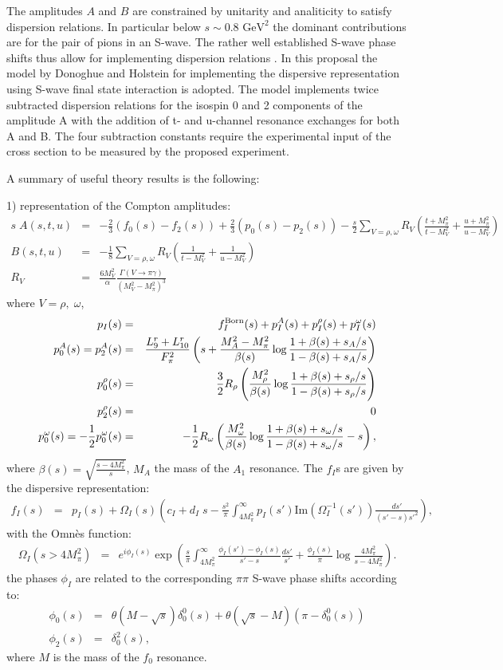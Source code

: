 \documentclass[12pt,epsfig]{article}
\newcommand{\bea}{\begin{eqnarray}}
\newcommand{\eea}{\end{eqnarray}}
\begin{document}
The amplitudes $A$ and $B$ are constrained by unitarity and analiticity to satisfy dispersion relations. In particular below $s\sim 0.8\text{ GeV}^2$ the dominant contributions are for the pair of pions in an S-wave. The rather well established S-wave phase shifts thus allow for implementing  dispersion relations \cite{Donoghue:1993kw, Oller:2008kf,Moussallam:2013una,Dai:2014zta,Dai:2014lza,Dai:2016ytz}.  In this proposal the model by Donoghue and Holstein \cite{Donoghue:1993kw} for implementing the dispersive representation using S-wave final state interaction is adopted. The model implements   twice subtracted dispersion relations for the isospin 0 and 2 components of the  amplitude A with the addition of t- and u-channel resonance exchanges for both A and B. The four subtraction constants require the experimental input of the cross section to be measured by the proposed experiment. 

A summary of useful  theory results is the following:  

1) representation of the Compton amplitudes:
\bea
s\;A(s,t,u)&=& -\frac 23(f_0(s)-f_2(s))+\frac 23 (p_0(s)-p_2(s))-\frac s 2\sum_{V=\rho,\omega} R_V (\frac{t+M_\pi^2}{t-M_V^2}+\frac{u+M_\pi^2}{u-M_V^2})\nonumber\\
B(s,t,u)&=&-\frac 18 \sum_{V=\rho,\omega} R_V (\frac{1}{t-M_V^2}+\frac{1}{u-M_V^2})\nonumber\\
R_V&=&\frac{6 M_V^2}{\alpha} \frac{\Gamma(V\to \pi \gamma)}{(M_V^2-M_\pi^2)^3}
\eea
where $V=\rho,\;\omega$, 
\bea
p_I(s)&=& f_I^{\rm Born}(s)+p_I^A(s)+p^\rho_I(s)+p_I^\omega(s)\nonumber\\
p_0^A(s)=p_2^A(s)&=&\frac{L_9^r+L_{10}^r}{F_\pi^2}\left(s+\frac{M_A^2-M_\pi^2}{\beta(s)}\log\frac{1+\beta(s)+s_A/s}{1-\beta(s)+s_A/s}\right)\nonumber\\
p_0^\rho(s)&=&\frac 32 R_\rho\left( \frac{M_\rho^2}{\beta(s)}  \log\frac{1+\beta(s)+s_\rho/s}{1-\beta(s)+s_\rho/s}\right)\nonumber\\
p_2^\rho(s)&=&0\nonumber\\
p_0^\omega(s)=-\frac 12 p_0^\omega(s)&=&-\frac 12 R_\omega\left( \frac{M_\omega^2}{\beta(s)}  \log\frac{1+\beta(s)+s_\omega/s}{1-\beta(s)+s_\omega/s}-s\right),
\eea
where $\beta(s)=\sqrt{\frac{s-4 M_\pi^2}{s}}$, $M_A$ the mass of the $A_1$ resonance. The $f_I$s are given by the dispersive representation:
\bea
f_I(s)&=& p_I(s)+\Omega_I(s)\left(c_I+d_I\;s-\frac{s^2}{\pi} \int_{4M_\pi^2}^\infty p_I(s') \text{Im}(\Omega_I^{-1}(s'))\frac {ds'} {(s'-s) s'^2}\right),
\eea
with the Omn\`es function:
\bea\Omega_I(s>4 M_\pi^2)&=&e^{i\phi_I(s)} \exp\left(\frac s\pi\int_{4 M_\pi^2}^\infty \frac{\phi_I(s')-\phi_I(s)}{s'-s} \frac{ds'}{s'}+\frac{\phi_I(s)}{\pi}\log\frac{4M_\pi^2}{s-4M_\pi^2}\right).
\eea
the phases $\phi_I$ are related to the corresponding $\pi\pi$ S-wave phase shifts according to:
\bea
\phi_0(s)&=&\theta(M-\sqrt{s}) \delta_0^0(s)+\theta( \sqrt{s}-M)(\pi-\delta_0^0(s))\nonumber\\
\phi_2(s)&=&\delta_0^2(s),
\eea
where $M$ is the mass of the $f_0$ resonance.  
\end{document}
